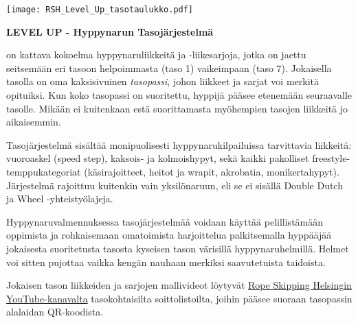\documentclass{article}
\begin{document}

\noindent\begin{minipage}[t]{0.3\textwidth} %
	\vspace*{-3em}
	\texttt{[image: RSH\_Level\_Up\_tasotaulukko.pdf]}
\end{minipage}%
\hfill%
\begin{minipage}[t]{0.70\textwidth} %
    {\LARGE \bfseries LEVEL UP - Hyppynarun Tasojärjestelmä} %

	\setlength{\parindent}{0em} %
	\setlength{\parskip}{.7em} %
	\vspace*{0mm}
	on kattava kokoelma hyppynaruliikkeitä ja \mbox{-liikesarjoja}, jotka on
	jaettu seitsemään eri tasoon helpoimmasta (taso 1) vaikeimpaan (taso 7).
	Jokaisella tasolla on oma kaksisivuinen \emph{tasopassi}, johon liikkeet ja
	sarjat voi merkitä opituiksi. Kun koko tasopassi on suoritettu, hyppijä
	pääsee etenemään seuraavalle tasolle. Mikään ei kuitenkaan estä
	suorittamasta myöhempien tasojen liikkeitä jo aikaisemmin.

	Tasojärjestelmä sisältää monipuolisesti hyppynarukilpailuissa tarvittavia
	liikkeitä: vuoroaskel (speed step), kaksois- ja kolmoishypyt, sekä kaikki
	pakolliset freestyle-temppukategoriat (käsirajoitteet, heitot ja wrapit,
	akrobatia, monikertahypyt). Järjestelmä rajoittuu kuitenkin vain
	yksilönaruun, eli se ei sisällä Double Dutch ja Wheel
	\mbox{-yhteistyölajeja}.

	Hyppynaruvalmennuksessa tasojärjestelmää voidaan käyttää pelillistämään
	oppimista ja rohkaisemaan omatoimista harjoittelua palkitsemalla hyppääjää
	jokaisesta suoritetusta tasosta kyseisen tason värisillä hyppynaruhelmillä.
	Helmet voi sitten pujottaa vaikka kengän nauhaan merkiksi saavutetuista
	taidoista.

	Jokaisen tason liikkeiden ja sarjojen mallivideot löytyvät
	\href{https://www.youtube.com/@RopeSkippingHelsinki}{Rope Skipping Helsingin
	YouTube-kanavalta} tasokohtaisilta soittolistoilta, joihin pääsee suoraan
	tasopassin alalaidan QR-koodista.
\end{minipage}

\vspace*{-1em}
\end{document}
